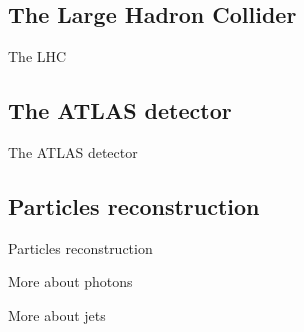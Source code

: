 \documentclass[10pt]{beamer}
\begin{document}
\subsection{The Large Hadron Collider}
\begin{frame}{The LHC}
    
\end{frame}

\subsection{The ATLAS detector}
\begin{frame}{The ATLAS detector}

\end{frame}

\subsection{Particles reconstruction}
\begin{frame}{Particles reconstruction}

\end{frame}

\begin{frame}{More about photons}

\end{frame}

\begin{frame}{More about jets}

\end{frame}
\end{document}
